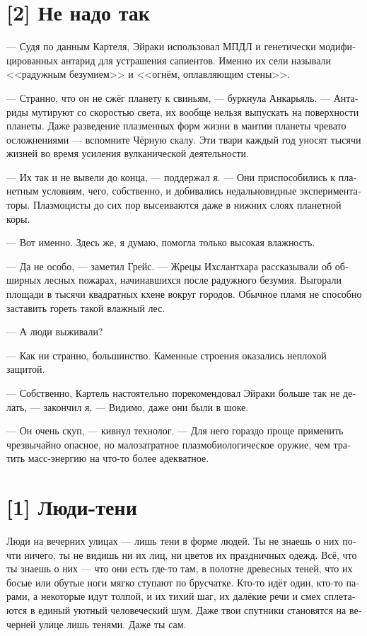 \documentclass[a4paper,12pt,fleqn]{book}\usepackage{polyglossia}\setdefaultlanguage[babelshorthands=true]{russian}\setotherlanguage{english}\defaultfontfeatures{Ligatures=TeX,Mapping=tex-text}\usepackage{xcolor}\newcommand{\ml}[3]{#2}
\begin{document}
{\section{[2] Не надо так}

--- Судя по данным Картеля, Эйраки использовал МПДЛ и генетически модифицированных антарид для устрашения сапиентов.
Именно их сели называли <<радужным безумием>> и <<огнём, оплавляющим стены>>.

--- Странно, что он не сжёг планету к свиньям, --- буркнула Анкарьяль.
--- Антариды мутируют со скоростью света, их вообще нельзя выпускать на поверхности планеты.
Даже разведение плазменных форм жизни в мантии планеты чревато осложнениями --- вспомните Чёрную скалу.
Эти твари каждый год уносят тысячи жизней во время усиления вулканической деятельности.

--- Их так и не вывели до конца, --- поддержал я.
--- Они приспособились к планетным условиям, чего, собственно, и добивались недальновидные экспериментаторы.
Плазмоцисты до сих пор высеиваются даже в нижних слоях планетной коры.

--- Вот именно.
Здесь же, я думаю, помогла только высокая влажность.

--- Да не особо, --- заметил Грейс.
--- Жрецы Ихслантхара рассказывали об обширных лесных пожарах, начинавшихся после радужного безумия.
Выгорали площади в тысячи квадратных кхене вокруг городов.
Обычное пламя не способно заставить гореть такой влажный лес.

--- А люди выживали?

--- Как ни странно, большинство.
Каменные строения оказались неплохой защитой.

--- Собственно, Картель настоятельно порекомендовал Эйраки больше так не делать, --- закончил я.
--- Видимо, даже они были в шоке.

--- Он очень скуп, --- кивнул технолог.
--- Для него гораздо проще применить чрезвычайно опасное, но малозатратное плазмобиологическое оружие, чем тратить масс-энергию на что-то более адекватное.

\section{[1] Люди-тени}

Люди на вечерних улицах --- лишь тени в форме людей.
Ты не знаешь о них почти ничего, ты не видишь ни их лиц, ни цветов их праздничных одежд.
Всё, что ты знаешь о них --- что они есть где-то там, в полотне древесных теней, что их босые или обутые ноги мягко ступают по брусчатке.
Кто-то идёт один, кто-то парами, а некоторые идут толпой, и их тихий шаг, их далёкие речи и смех сплетаются в единый уютный человеческий шум.
Даже твои спутники становятся на вечерней улице лишь тенями.
Даже ты сам.

}
\end{document}
